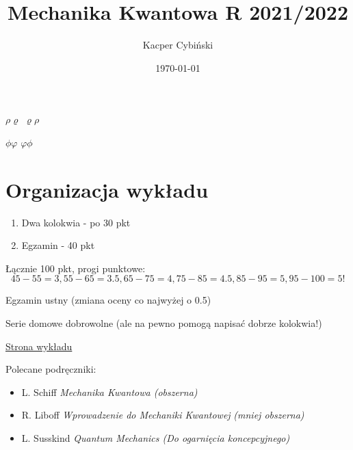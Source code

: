 \documentclass[12pt,a4paper]{report}
\title{Mechanika Kwantowa R 2021/2022}
\author{Kacper Cybiński}
\date{\today}
\newcommand{\link}[2]{{\color{cyan} \href{#1}{#2}}}
\begin{document}
$\rho\varrho$
\let\temp\rho
\let\rho\varrho
\let\varrho\temp
$\rho\varrho$

$\phi\varphi$
\let\temp\phi
\let\phi\varphi
\let\varphi\temp
$\phi\varphi$

\maketitle

\chapter*{Organizacja wykładu}
\begin{enumerate}
    \item Dwa kolokwia - po 30 pkt
    \item Egzamin - 40 pkt
\end{enumerate}
Łącznie 100 pkt, progi punktowe:
\[45-55 = 3, 55-65 = 3.5, 65-75=4, 75-85=4.5, 85-95 = 5, 95-100=5!\]

Egzamin ustny (zmiana oceny co najwyżej o 0.5)

Serie domowe dobrowolne (ale na pewno pomogą napisać dobrze kolokwia!)

{\color{blue} \link{https://kampus-student2.ckc.uw.edu.pl/course/view.php?id=9707}{Strona wykładu}}


Polecane podręczniki:
\begin{itemize}
    \item L. Schiff \textit{Mechanika Kwantowa (obszerna)}
    \item R. Liboff \textit{Wprowadzenie do Mechaniki Kwantowej} \textit{(mniej obszerna)}
    \item L. Susskind \textit{Quantum Mechanics (Do ogarnięcia koncepcyjnego)}
\end{itemize}
\end{document}
